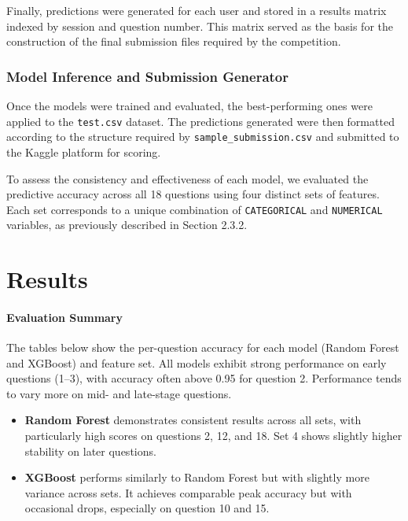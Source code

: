 \documentclass[12pt]{article}
\begin{document}
	Finally, predictions were generated for each user and stored in a results matrix indexed by session and question number. This matrix served as the basis for the construction of the final submission files required by the competition.
	
	
	\subsubsection{Model Inference and Submission Generator}
	
	Once the models were trained and evaluated, the best-performing ones were applied to the \texttt{test.csv} dataset. The predictions generated were then formatted according to the structure required by \texttt{sample\_submission.csv} and submitted to the Kaggle platform for scoring.
	
	To assess the consistency and effectiveness of each model, we evaluated the predictive accuracy across all 18 questions using four distinct sets of features. Each set corresponds to a unique combination of \texttt{CATEGORICAL} and \texttt{NUMERICAL} variables, as previously described in Section 2.3.2.
	
\section{Results}

\vspace{0.5em}
	\paragraph{Evaluation Summary}
	
	The tables below show the per-question accuracy for each model (Random Forest and XGBoost) and feature set. All models exhibit strong performance on early questions (1–3), with accuracy often above 0.95 for question 2. Performance tends to vary more on mid- and late-stage questions.
	
	\vspace{0.5em}
	\begin{itemize}
		\item \textbf{Random Forest} demonstrates consistent results across all sets, with particularly high scores on questions 2, 12, and 18. Set 4 shows slightly higher stability on later questions.
		\item \textbf{XGBoost} performs similarly to Random Forest but with slightly more variance across sets. It achieves comparable peak accuracy but with occasional drops, especially on question 10 and 15.
	\end{itemize}
	
\end{document}

